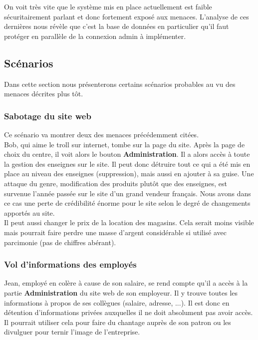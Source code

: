 \documentclass[a4paper]{article}
\begin{document}
On voit très vite que le système mis en place actuellement est faible sécuritairement parlant et donc fortement exposé aux menaces. L'analyse de ces dernières nous révèle que c'est la base de données en particulier qu'il faut protéger en parallèle de la connexion admin à implémenter.

\subsection{Scénarios}
Dans cette section nous présenterons certains scénarios probables au vu des menaces décrites plus tôt.

\subsubsection{Sabotage du site web}
Ce scénario va montrer deux des menaces précédemment citées.\\
Bob, qui aime le troll sur internet, tombe sur la page du site. Après la page de choix du centre, il voit alors le bouton \textbf{Administration}. Il a alors accès à toute la gestion des enseignes sur le site. Il peut donc détruire tout ce qui a été mis en place au niveau des enseignes (suppression), mais aussi en ajouter à sa guise. Une attaque du genre, modification des produits plutôt que des enseignes, est survenue l'année passée sur le site d'un grand vendeur français. Nous avons dans ce cas une perte de crédibilité énorme pour le site selon le degré de changements apportés au site.\\
Il peut aussi changer le prix de la location des magasins. Cela serait moins visible mais pourrait faire perdre une masse d'argent considérable si utilisé avec parcimonie (pas de chiffres abérant).

\subsubsection{Vol d'informations des employés}
Jean, employé en colère à cause de son salaire, se rend compte qu'il a accès à la partie \textbf{Administration} du site web de son employeur. Il y trouve toutes les informations à propos de ses collègues (salaire, adresse, ...). Il est donc en détention d'informations privées auxquelles il ne doit absolument pas avoir accès. Il pourrait utiliser cela pour faire du chantage auprès de son patron ou les divulguer pour ternir l'image de l'entreprise.
\end{document}
